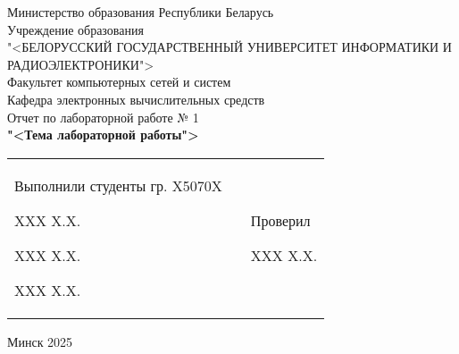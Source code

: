 \begin{center}
  Министерство образования Республики Беларусь \\
  \bigskip
  Учреждение образования \\
  "<БЕЛОРУССКИЙ ГОСУДАРСТВЕННЫЙ УНИВЕРСИТЕТ ИНФОРМАТИКИ И РАДИОЭЛЕКТРОНИКИ"> \\
  \bigskip \bigskip
  Факультет компьютерных сетей и систем \\
  Кафедра электронных вычислительных средств \\
  \bigskip \bigskip \bigskip \bigskip \bigskip \bigskip \bigskip \bigskip \bigskip \bigskip \bigskip \bigskip
  Отчет по лабораторной работе № 1 \\
  \bf{"<Тема лабораторной работы">}\normalfont \\
  \bigskip \bigskip \bigskip \bigskip \bigskip \bigskip \bigskip \bigskip \bigskip \bigskip \bigskip \bigskip
  \begin{table}[ht]
    \begin{tabular}{p{7cm} p{1cm} p{7cm}}
        Выполнили студенты гр. X5070X \par XXX X.X. \par XXX X.X.\par XXX X.X.& \hfill & \hspace*{30 mm}Проверил \par \hspace*{29 mm} XXX X.X.
    \end{tabular}
  \end{table}
  \vfill \vfill
  \centerline{Минск 2025}
\end{center}
\newpage

